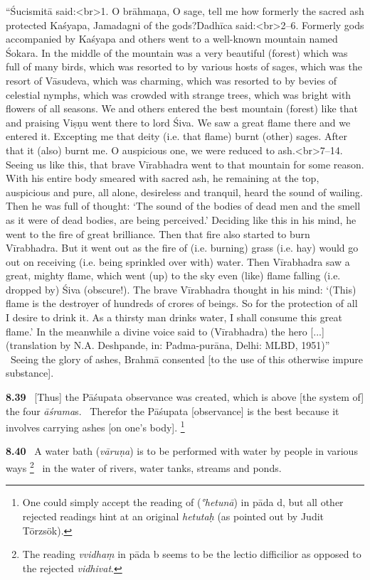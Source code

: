 \documentclass{article}
\newcommand{\skt}[1]{\textit{#1}}
\begin{document}
{``Śucismitā said:<br>1. O brāhmaṇa, O sage, tell me how formerly the sacred ash protected Kaśyapa, Jamadagni of the gods?Dadhīca said:<br>2--6. Formerly gods accompanied by Kaśyapa and others went to a well-known mountain named Śokara. In the middle of the mountain was a very beautiful (forest) which was full of many birds, which was resorted to by various hosts of sages, which was the resort of Vāsudeva, which was charming, which was resorted to by bevies of celestial nymphs, which was crowded with strange trees, which was bright with flowers of all seasons. We and others entered the best mountain (forest) like that and praising Viṣṇu went there to lord Śiva. We saw a great flame there and we entered it. Excepting me that deity (i.e. that flame) burnt (other) sages. After that it (also) burnt me. O auspicious one, we were reduced to ash.<br>7--14. Seeing us like this, that brave Vīrabhadra went to that mountain for some reason. With his entire body smeared with sacred ash, he remaining at the top, auspicious and pure, all alone, desireless and tranquil, heard the sound of wailing. Then he was full of thought: ‘The sound of the bodies of dead men and the smell as it were of dead bodies, are being perceived.’ Deciding like this in his mind, he went to the fire of great brilliance. Then that fire also started to burn Vīrabhadra. But it went out as the fire of (i.e. burning) grass (i.e. hay) would go out on receiving (i.e. being sprinkled over with) water. Then Vīrabhadra saw a great, mighty flame, which went (up) to the sky even (like) flame falling (i.e. dropped by) Śiva (obscure!). The brave Vīrabhadra thought in his mind: ‘(This) flame is the destroyer of hundreds of crores of beings. So for the protection of all I desire to drink it. As a thirsty man drinks water, I shall consume this great flame.’ In the meanwhile a divine voice said to (Vīrabhadra) the hero [...] (translation by N.A. Deshpande, in: Padma-purāna, Delhi: MLBD, 1951)''  }%
\ Seeing the glory of ashes, Brahmā consented [to the use of this otherwise impure substance].%


\textbf{8.39}%
\ [Thus] the Pāśupata observance was created, which is above [the system of] the four \skt{āśrama}s.%
\ Therefor the Pāśupata [observance] is the best because it involves carrying ashes [on one's body].%
\footnote{One could simply accept the reading of \msCc (\skt{°hetunā}) in pāda d, but all other rejected                 readings hint at an original \skt{hetutaḥ} (as pointed out by Judit Törzsök). }%


\textbf{8.40}%
\ A water bath (\skt{vāruṇa}) is to be performed with water by people in various ways%
\footnote{The reading \skt{vvidhaṃ} in pāda b seems to be the lectio difficilior as opposed to                the rejected \skt{vidhivat}. }%
\ in the water of rivers, water tanks, streams and ponds.%
\end{document}
